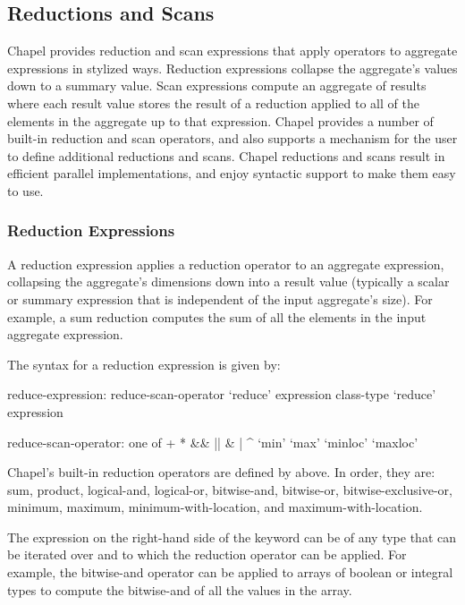 \subsection{Reductions and Scans}
\label{Reductions_and_Scans}

Chapel provides reduction and scan expressions that apply operators to
aggregate expressions in stylized ways.  Reduction expressions
collapse the aggregate's values down to a summary value.  Scan
expressions compute an aggregate of results where each result value
stores the result of a reduction applied to all of the elements in the
aggregate up to that expression.  Chapel provides a number of built-in
reduction and scan operators, and also supports a mechanism for the
user to define additional reductions and scans.  Chapel reductions and
scans result in efficient parallel implementations, and enjoy
syntactic support to make them easy to use.


\subsubsection{Reduction Expressions}
\label{reduce}

A reduction expression applies a reduction operator to an aggregate
expression, collapsing the aggregate's dimensions down into a result
value (typically a scalar or summary expression that is independent of
the input aggregate's size).  For example, a sum reduction computes
the sum of all the elements in the input aggregate expression.

The syntax for a reduction expression is given by:
\begin{syntax}
reduce-expression:
  reduce-scan-operator `reduce' expression
  class-type `reduce' expression

reduce-scan-operator: one of
  + * && || & | ^ `min' `max' `minloc' `maxloc'
\end{syntax}

Chapel's built-in reduction operators are defined
by  above.  In order, they are: sum,
product, logical-and, logical-or, bitwise-and, bitwise-or,
bitwise-exclusive-or, minimum, maximum, minimum-with-location, and
maximum-with-location.

The expression on the right-hand side of the  keyword
can be of any type that can be iterated over and to which the
reduction operator can be applied.  For example, the bitwise-and
operator can be applied to arrays of boolean or integral types to
compute the bitwise-and of all the values in the array.

